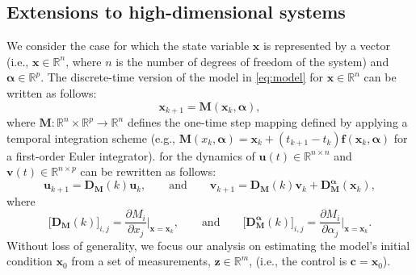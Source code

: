 \documentclass{article}
\begin{document}
\subsection{Extensions to high-dimensional systems}
\textcolor{rev}{We consider the case for which the state variable $\mathbf{x}$ is represented by a vector (i.e., $\mathbf{x}\in \mathbb{R}^n$, where $n$ is the number of degrees of freedom of the system) and $\boldsymbol{\alpha} \in \mathbb{R}^{p}$. The discrete-time version of the model in \cref{eq:model} for $\mathbf{x}\in \mathbb{R}^n$ can be written as follows:
\begin{equation}
    \mathbf{x}_{k+1} = \boldsymbol{M}(\mathbf{x}_k,\boldsymbol{\alpha}), \label{eq:model_discrete_vector}
\end{equation}
where $\boldsymbol{M}:\mathbb{R}^{n}  \times \mathbb{R}^p \to \mathbb{R}^{n}$ defines the one-time step mapping defined by applying a temporal integration scheme (e.g., $\boldsymbol{M}(x_k,\boldsymbol{\alpha}) = \mathbf{x}_k + (t_{k+1}-t_k)\boldsymbol{f}(\mathbf{x}_k,\boldsymbol{\alpha})$ for a first-order Euler integrator).  for the dynamics of $\mathbf{u}(t) \in \mathbb{R}^{n\times n}$ and $\mathbf{v}(t) \in \mathbb{R}^{n\times p}$ can be rewritten as follows:
\begin{equation}
    \mathbf{u}_{k+1} = \mathbf{D}_{\mathbf{M}}(k) \mathbf{u}_k, \qquad \text{and} \qquad  \mathbf{v}_{k+1} = \mathbf{D}_{\mathbf{M}}(k) \mathbf{v}_k + \mathbf{D}_{\mathbf{M}}^{\boldsymbol{\alpha}}(\mathbf{x}_k),
\label{eq:sens_discrete_vector}
\end{equation}
where
\begin{equation}
    \bigg[\mathbf{D}_{\mathbf{M}}(k)\bigg]_{i,j} = \dfrac{\partial M_i}{\partial x_j}\bigg|_{\mathbf{x}=\mathbf{x}_k}, \qquad \text{and} \qquad \bigg[\mathbf{D}_{\mathbf{M}}^{\boldsymbol{\alpha}}(k)\bigg]_{i,j} = \dfrac{\partial M_i}{\partial \alpha_j}\bigg|_{\mathbf{x}=\mathbf{x}_k}.
\end{equation}
Without loss of generality, we focus our analysis on estimating the model's initial condition $\mathbf{x}_0$ from a set of measurements, $\mathbf{z} \in \mathbb{R}^m$, (i.e., the control is $\mathbf{c}=\mathbf{x}_0$).}

\end{document}
